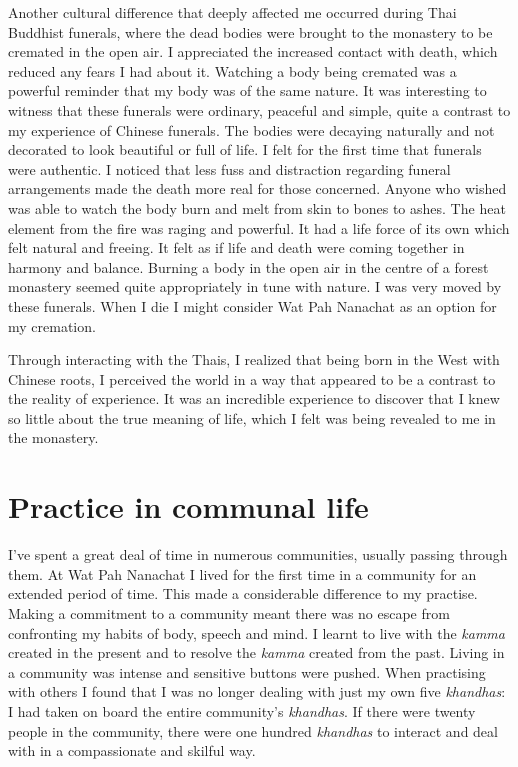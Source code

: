 Another cultural difference that deeply affected me occurred during Thai
Buddhist funerals, where the dead bodies were brought to the monastery
to be cremated in the open air. I appreciated the increased contact with
death, which reduced any fears I had about it. Watching a body being
cremated was a powerful reminder that my body was of the same nature. It
was interesting to witness that these funerals were ordinary, peaceful
and simple, quite a contrast to my experience of Chinese funerals. The
bodies were decaying naturally and not decorated to look beautiful or
full of life. I felt for the first time that funerals were authentic. I
noticed that less fuss and distraction regarding funeral arrangements
made the death more real for those concerned. Anyone who wished was able
to watch the body burn and melt from skin to bones to ashes. The heat
element from the fire was raging and powerful. It had a life force of
its own which felt natural and freeing. It felt as if life and death
were coming together in harmony and balance. Burning a body in the open
air in the centre of a forest monastery seemed quite appropriately in
tune with nature. I was very moved by these funerals. When I die I might
consider Wat Pah Nanachat as an option for my cremation. 

Through interacting with the Thais, I realized that being born in the
West with Chinese roots, I perceived the world in a way that appeared to
be a contrast to the reality of experience. It was an incredible
experience to discover that I knew so little about the true meaning of
life, which I felt was being revealed to me in the monastery. 

\section{Practice in communal life}

I've spent a great deal of time in numerous communities, usually passing
through them. At Wat Pah Nanachat I lived for the first time in a
community for an extended period of time. This made a considerable
difference to my practise. Making a commitment to a community meant
there was no escape from confronting my habits of body, speech and mind. 
I learnt to live with the \emph{kamma} created in the present and to
resolve the \emph{kamma} created from the past. Living in a community
was intense and sensitive buttons were pushed. When practising with
others I found that I was no longer dealing with just my own five
\emph{khandhas}: I had taken on board the entire community's
\emph{khandhas}. If there were twenty people in the community, there
were one hundred \emph{khandhas} to interact and deal with in a
compassionate and skilful way. 

